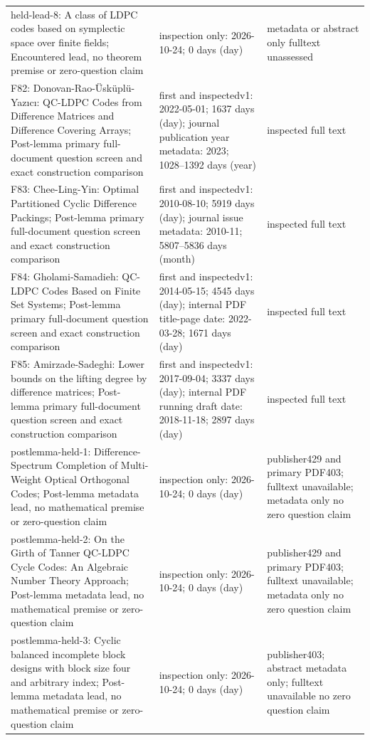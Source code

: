 {\begin{longtable}{@{}>{\raggedright\arraybackslash}p{.27\linewidth}>{\raggedright\arraybackslash}p{.47\linewidth}>{\raggedright\arraybackslash}p{.18\linewidth}@{}}
held-lead-8: A class of LDPC codes based on symplectic space over finite fields; Encountered lead, no theorem premise or zero-question claim & inspection only: 2026-10-24; 0 days (day) & metadata or abstract only fulltext unassessed\\[4pt]
F82: Donovan-Rao-Üsküplü-Yaz\i{}c\i{}: QC-LDPC Codes from Difference Matrices and Difference Covering Arrays; Post-lemma primary full-document question screen and exact construction comparison & first and inspectedv1: 2022-05-01; 1637 days (day); journal publication year metadata: 2023; 1028--1392 days (year) & inspected full text\\[4pt]
F83: Chee-Ling-Yin: Optimal Partitioned Cyclic Difference Packings; Post-lemma primary full-document question screen and exact construction comparison & first and inspectedv1: 2010-08-10; 5919 days (day); journal issue metadata: 2010-11; 5807--5836 days (month) & inspected full text\\[4pt]
F84: Gholami-Samadieh: QC-LDPC Codes Based on Finite Set Systems; Post-lemma primary full-document question screen and exact construction comparison & first and inspectedv1: 2014-05-15; 4545 days (day); internal PDF title-page date: 2022-03-28; 1671 days (day) & inspected full text\\[4pt]
F85: Amirzade-Sadeghi: Lower bounds on the lifting degree by difference matrices; Post-lemma primary full-document question screen and exact construction comparison & first and inspectedv1: 2017-09-04; 3337 days (day); internal PDF running draft date: 2018-11-18; 2897 days (day) & inspected full text\\[4pt]
postlemma-held-1: Difference-Spectrum Completion of Multi-Weight Optical Orthogonal Codes; Post-lemma metadata lead, no mathematical premise or zero-question claim & inspection only: 2026-10-24; 0 days (day) & publisher429 and primary PDF403; fulltext unavailable; metadata only no zero question claim\\[4pt]
postlemma-held-2: On the Girth of Tanner QC-LDPC Cycle Codes: An Algebraic Number Theory Approach; Post-lemma metadata lead, no mathematical premise or zero-question claim & inspection only: 2026-10-24; 0 days (day) & publisher429 and primary PDF403; fulltext unavailable; metadata only no zero question claim\\[4pt]
postlemma-held-3: Cyclic balanced incomplete block designs with block size four and arbitrary index; Post-lemma metadata lead, no mathematical premise or zero-question claim & inspection only: 2026-10-24; 0 days (day) & publisher403; abstract metadata only; fulltext unavailable no zero question claim\\[4pt]

\end{longtable}}
